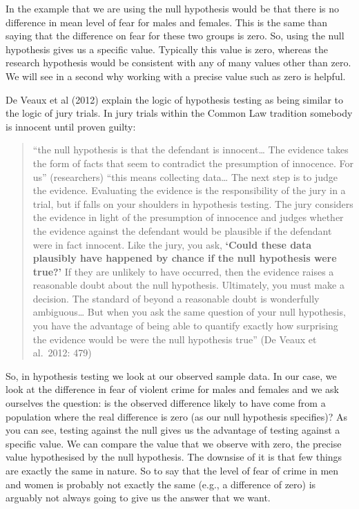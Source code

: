 \documentclass[]{book}
\theoremstyle{definition}
\theoremstyle{definition}
\theoremstyle{definition}
\theoremstyle{remark}
\begin{document}
In the example that we are using the null hypothesis would be that there
is no difference in mean level of fear for males and females. This is
the same than saying that the difference on fear for these two groups is
zero. So, using the null hypothesis gives us a specific value. Typically
this value is zero, whereas the research hypothesis would be consistent
with any of many values other than zero. We will see in a second why
working with a precise value such as zero is helpful.

De Veaux et al (2012) explain the logic of hypothesis testing as being
similar to the logic of jury trials. In jury trials within the Common
Law tradition somebody is innocent until proven guilty:

\begin{quote}
``the null hypothesis is that the defendant is innocent\ldots{} The
evidence takes the form of facts that seem to contradict the presumption
of innocence. For us'' (researchers) ``this means collecting
data\ldots{} The next step is to judge the evidence. Evaluating the
evidence is the responsibility of the jury in a trial, but if falls on
your shoulders in hypothesis testing. The jury considers the evidence in
light of the presumption of innocence and judges whether the evidence
against the defendant would be plausible if the defendant were in fact
innocent. Like the jury, you ask, \textbf{`Could these data plausibly
have happened by chance if the null hypothesis were true?'} If they are
unlikely to have occurred, then the evidence raises a reasonable doubt
about the null hypothesis. Ultimately, you must make a decision. The
standard of beyond a reasonable doubt is wonderfully ambiguous\ldots{}
But when you ask the same question of your null hypothesis, you have the
advantage of being able to quantify exactly how surprising the evidence
would be were the null hypothesis true'' (De Veaux et al.~2012: 479)
\end{quote}

So, in hypothesis testing we look at our observed sample data. In our
case, we look at the difference in fear of violent crime for males and
females and we ask ourselves the question: is the observed difference
likely to have come from a population where the real difference is zero
(as our null hypothesis specifies)? As you can see, testing against the
null gives us the advantage of testing against a specific value. We can
compare the value that we observe with zero, the precise value
hypothesised by the null hypothesis. The downsise of it is that few
things are exactly the same in nature. So to say that the level of fear
of crime in men and women is probably not exactly the same (e.g., a
difference of zero) is arguably not always going to give us the answer
that we want.
\end{document}
